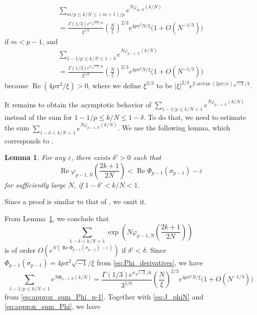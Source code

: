 \documentclass[a4paper,dvipdfmx]{amsart}
\theoremstyle{plain}
\newtheorem{lem}[thm]{Lemma}
\theoremstyle{definition}
\theoremstyle{remark}
\renewcommand{\Re}{\operatorname{Re}}
\renewcommand{\i}{\sqrt{-1}}
\newcommand{\saddle}{\sigma}
\numberwithin{equation}{section}
\begin{document}
\begin{multline}\label{eq:approx_sum_Phi}
  \sum_{m/p\le k/N\le(m+1)/p}e^{N\varphi_{m,N}(k/N)}
  \\
  =
  \frac{\Gamma(1/3)e^{\pi\i/6}}{3^{1/6}}
  \left(\frac{N}{\xi}\right)^{2/3}
  e^{4p\pi^2N/\xi}
  \bigl(1+O(N^{-1/3})\bigr)
\end{multline}
if $m<p-1$, and
\begin{multline}\label{eq:approx_sum_Phi_p-1}
  \sum_{1-1/p\le k/N\le1-\delta}e^{N\varphi_{p-1,N}(k/N)}
  \\
  =
  \frac{\Gamma(1/3)e^{\pi\i/6}}{3^{1/6}}
  \left(\frac{N}{\xi}\right)^{2/3}
  e^{4p\pi^2N/\xi}
  \bigl(1+O(N^{-1/3})\bigr)
\end{multline}
because $\Re(4p\pi^2/\xi)>0$, where we define $\xi^{2/3}$ to be $|\xi|^{2/3}e^{2\arctan(2p\pi/\kappa)\i/3}$.
\par
It remains to obtain the asymptotic behavior of $\sum_{1-1/p\le k/N<1}e^{N\varphi_{p-1,N}(k/N)}$ instead of the sum for $1-1/p\le k/N\le 1-\delta$.
To do that, we need to estimate the sum $\sum_{1-\delta<k/N<1}e^{N\varphi_{p-1,N}(k/N)}$.
We use the following lemma, which corresponds to \cite[Lemma~6.1]{Murakami:CANJM2023}.
\begin{lem}\label{lem:Phi1}
For any $\varepsilon$, there exists $\delta'>0$ such that
\begin{equation*}
  \Re\varphi_{p-1,N}
  \left(
    \frac{2k+1}{2N}
  \right)
  <
  \Re\Phi_{p-1}(\saddle_{p-1})-\varepsilon
\end{equation*}
for sufficiently large $N$, if $1-\delta'<k/N<1$.
\end{lem}
Since a proof is similar to that of \cite[Lemma~6.1]{Murakami:CANJM2023}, we omit it.
\par
From Lemma~\ref{lem:Phi1}, we conclude that
\begin{equation*}
  \sum_{1-\delta<k/N<1}
  \exp\left(N\varphi_{p-1,N}\left(\frac{2k+1}{2N}\right)\right)
\end{equation*}
is of order $O\left(e^{N(\Re\Phi_{p-1}(\saddle_{p-1})-\varepsilon)}\right)$ if $\delta'<\delta$.
Since $\Phi_{p-1}(\saddle_{p-1})=4p\pi^2\i/\xi$ from \eqref{eq:Phi_derivatives}, we have
\begin{equation*}
  \sum_{1-1/p\le k/N<1}e^{N\Phi_{p-1,N}(k/N)}
  =
  \frac{\Gamma(1/3)e^{\pi\i/6}}{3^{1/6}}
  \left(\frac{N}{\xi}\right)^{2/3}
  e^{4p\pi^2N/\xi}
  \bigl(1+O(N^{-1/3})\bigr)
\end{equation*}
from \eqref{eq:approx_sum_Phi_p-1}.
Together with \eqref{eq:J_phiN} and \eqref{eq:approx_sum_Phi}, we have
\end{document}
